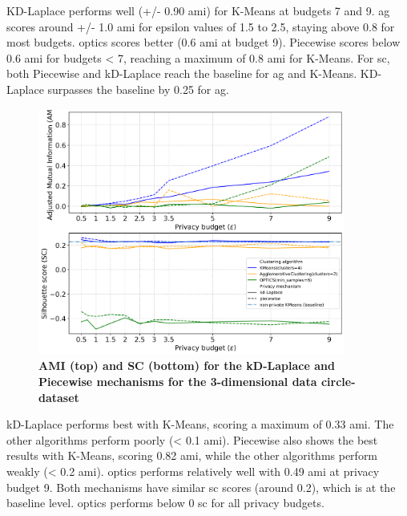 KD-Laplace performs well (+/- 0.90 \gls{ami}) for K-Means at budgets 7 and 9.
\gls{ag} scores around +/- 1.0 \gls{ami} for epsilon values of 1.5 to 2.5, staying above 0.8 for most budgets.
\gls{optics} scores better (0.6 \gls{ami} at budget 9).
Piecewise scores below 0.6 \gls{ami} for budgets < 7, reaching a maximum of 0.8 \gls{ami} for K-Means.
For \gls{sc}, both Piecewise and kD-Laplace reach the baseline for \gls{ag} and K-Means.
KD-Laplace surpasses the baseline by 0.25 for \gls{ag}.
\newpage
\begin{figure}[H]
  \centering

  \caption{\textbf{AMI (top) and SC (bottom) for the kD-Laplace and Piecewise mechanisms for the 3-dimensional data circle-dataset}}
  \includegraphics[width=0.9\textwidth]{Results/kd-laplace/kd-Laplace/circle-dataset/ami-and-sc_3_dimensions.png}

  \label{fig:validation-circle-dataset_comparison_3d-laplace}
\end{figure}
kD-Laplace performs best with K-Means, scoring a maximum of 0.33 \gls{ami}. The other algorithms perform poorly (< 0.1 \gls{ami}).
Piecewise also shows the best results with K-Means, scoring 0.82 \gls{ami}, while the other algorithms perform weakly (< 0.2 \gls{ami}).
\gls{optics} performs relatively well with 0.49 \gls{ami} at privacy budget 9.
Both mechanisms have similar \gls{sc} scores (around 0.2), which is at the baseline level.
\gls{optics} performs below 0 \gls{sc} for all privacy budgets.
\newpage
